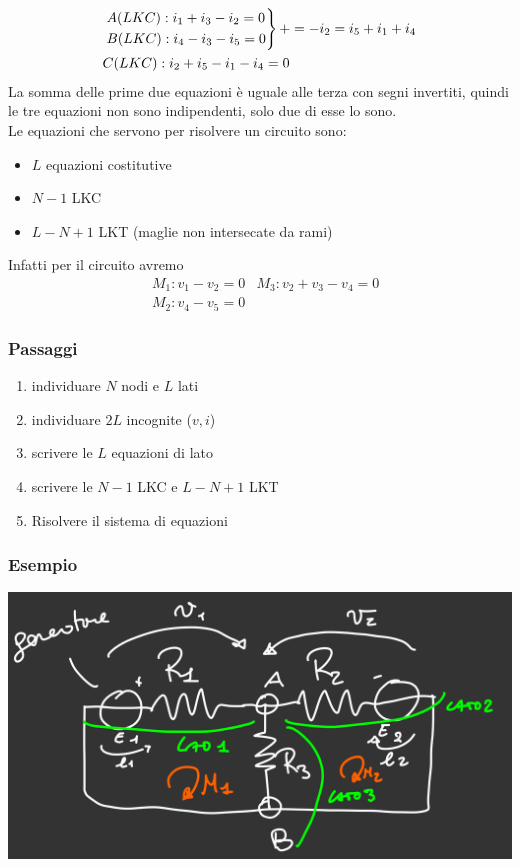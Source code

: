 \documentclass{article}
\begin{document}
\begin{align*}
    &\begin{rcases}
        A(LKC): i_1+i_3-i_2=0\\
        B(LKC): i_4-i_3-i_5=0
    \end{rcases}+ = -i_2 =i_5+i_1+i_4\\
    &C(LKC): i_2+i_5-i_1-i_4=0
\end{align*}
La somma delle prime due equazioni è uguale alle terza con segni invertiti, quindi le tre equazioni non sono indipendenti, solo due di esse lo sono.
\vspace*{0.1cm}\\
Le equazioni che servono per risolvere un circuito sono:
\begin{itemize}
    \item $L$ equazioni costitutive
    \item $N-1$ LKC
    \item $L-N+1$ LKT (maglie non intersecate da rami)
\end{itemize}
Infatti per il circuito avremo
\begin{align*}
    &M_1: v_1-v_2 = 0 & M_3: v_2+v_3 - v_4=0\\
    &M_2: v_4-v_5=0
\end{align*}

\subsubsection*{Passaggi}
\begin{enumerate}
    \item individuare $N$ nodi e $L$ lati
    \item individuare $2L$ incognite ($v,i$)
    \item scrivere le $L$ equazioni di lato
    \item scrivere le $N-1$ LKC e $L-N+1$ LKT
    \item Risolvere il sistema di equazioni
\end{enumerate}

\subsubsection{Esempio}
\begin{center}
    \includegraphics[scale=0.3]{Image/Esempio_Tanenblau.png}
\end{center}
\end{document}
